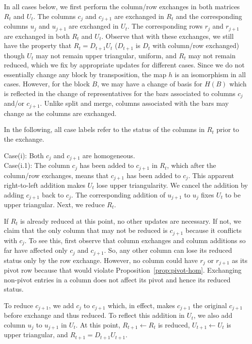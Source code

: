 \documentclass[letterpaper,11pt]{article}
\theoremstyle{plain}
\theoremstyle{definition}
\newcounter{li}
\begin{document}
In all cases below, we first perform the column/row exchanges in both matrices
$R_t$ and $U_t$. The columns $c_j$ and $c_{j+1}$ are exchanged in $R_t$ and
the corresponding columns $u_j$ and $u_{j+1}$ are exchanged in $U_t$. The corresponding
rows $r_j$ and $r_{j+1}$ are exchanged in both $R_t$ and $U_t$. Observe that 
with these exchanges, we still have the property that $R_t=D_{t+1}U_t$ ($D_{t+1}$ is $D_t$ with column/row exchanged) though $U_t$ may not
remain upper triangular, uniform, and $R_t$ may not remain reduced, which we fix
by appropriate updates for different cases. Since we do not essentially
change any block by transposition, the map $h$ is an isomorphism in all cases.
However, for the block $B$, we may have a change of basis for $H(B)$ which
is reflected in the change of representatives for the bars associated to columns
$c_j$ and/or $c_{j+1}$. Unlike split and merge, %
columns associated with the bars may change as the columns are exchanged.

In the following, all case labels refer to the status
of the columns in $R_t$ prior to the exchange.

Case(i): Both $c_j$ and $c_{j+1}$ are homogeneous.\\
Case(i.1): The column $c_j$ has been added to $c_{j+1}$ in $R_t$, which 
after the column/row exchanges, means that $c_{j+1}$ has been added to $c_j$. This apparent right-to-left addition makes $U_t$ lose upper triangularity. We cancel the addition by adding $c_{j+1}$ back to $c_j$. 
The corresponding addition of $u_{j+1}$ to $u_j$ fixes $U_t$ to be upper triangular.
Next, we reduce $R_t$. 

If $R_t$ is already reduced at this point, no other updates are necessary. If not,
we claim that the only column that may not be reduced is $c_{j+1}$ because it conflicts with
$c_j$. To see this, first observe that column exchanges and column additions
so far have affected only $c_j$ and $c_{j+1}$. So, any other column
can lose its reduced status only by the row exchange. However, no column
could have $r_j$ or $r_{j+1}$ as its pivot row because that would violate
Proposition~\ref{prop:pivot-hom}. Exchanging non-pivot entries in a column
does not affect its pivot and hence its reduced status.

To reduce $c_{j+1}$,
we add $c_j$ to $c_{j+1}$ which, in effect, makes $c_{j+1}$ 
the original $c_{j+1}$ before exchange and thus reduced. To reflect this
addition in $U_t$, we also add column
$u_j$ to $u_{j+1}$ in $U_t$. At this point, $R_{t+1}\leftarrow R_t$ is reduced, $U_{t+1}\leftarrow U_t$ is upper
triangular, and $R_{t+1}=D_{t+1}U_{t+1}$.
\end{document}

